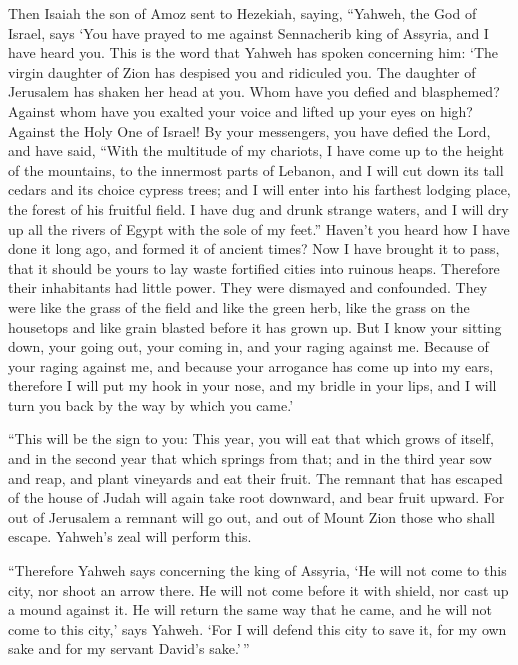  Then Isaiah the son of Amoz sent to Hezekiah, saying,
``Yahweh, the God of Israel, says `You have prayed to me against
Sennacherib king of Assyria, and I have heard you.  This
is the word that Yahweh has spoken concerning him: `The virgin daughter
of Zion has despised you and ridiculed you. The daughter of Jerusalem
has shaken her head at you.  Whom have you defied and
blasphemed? Against whom have you exalted your voice and lifted up your
eyes on high? Against the Holy One of Israel!  By your
messengers, you have defied the Lord, and have said, ``With the
multitude of my chariots, I have come up to the height of the mountains,
to the innermost parts of Lebanon, and I will cut down its tall cedars
and its choice cypress trees; and I will enter into his farthest lodging
place, the forest of his fruitful field.  I have dug and
drunk strange waters, and I will dry up all the rivers of Egypt with the
sole of my feet.''  Haven't you heard how I have done it
long ago, and formed it of ancient times? Now I have brought it to pass,
that it should be yours to lay waste fortified cities into ruinous
heaps.  Therefore their inhabitants had little power.
They were dismayed and confounded. They were like the grass of the field
and like the green herb, like the grass on the housetops and like grain
blasted before it has grown up.  But I know your sitting
down, your going out, your coming in, and your raging against me.
 Because of your raging against me, and because your
arrogance has come up into my ears, therefore I will put my hook in your
nose, and my bridle in your lips, and I will turn you back by the way by
which you came.'

 ``This will be the sign to you: This year, you will eat
that which grows of itself, and in the second year that which springs
from that; and in the third year sow and reap, and plant vineyards and
eat their fruit.  The remnant that has escaped of the
house of Judah will again take root downward, and bear fruit upward.
 For out of Jerusalem a remnant will go out, and out of
Mount Zion those who shall escape. Yahweh's zeal will perform this.

 ``Therefore Yahweh says concerning the king of Assyria,
`He will not come to this city, nor shoot an arrow there. He will not
come before it with shield, nor cast up a mound against it.
 He will return the same way that he came, and he will
not come to this city,' says Yahweh.  `For I will defend
this city to save it, for my own sake and for my servant David's
sake.'\,''

